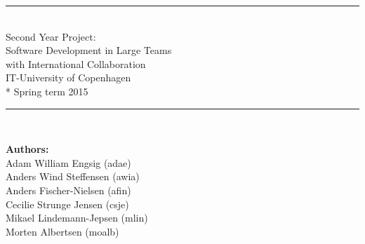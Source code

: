 \begin{titlepage}

\begin{center}


\vspace{67mm}

\rule{\textwidth}{1mm}\\
\vspace*{17mm}
\huge{
Second Year Project: \\ 
Software Development in Large Teams \\
with International Collaboration \\ 
\vspace*{8mm}
IT-University of Copenhagen \\*
Spring term 2015
}
\vspace*{7mm}

\rule{\textwidth}{1mm}\\

\vspace*{19mm}


\begin{Large}
\textbf{Authors:} \\
\vspace*{2mm}
Adam William Engsig  (adae)\\
Anders Wind Steffensen (awia) \\
Anders Fischer-Nielsen (afin) \\
Cecilie Strunge Jensen (csje) \\
Mikael Lindemann-Jepsen (mlin) \\
Morten Albertsen (moalb)
\end{Large}
\end{center}
\end{titlepage}
\newpage